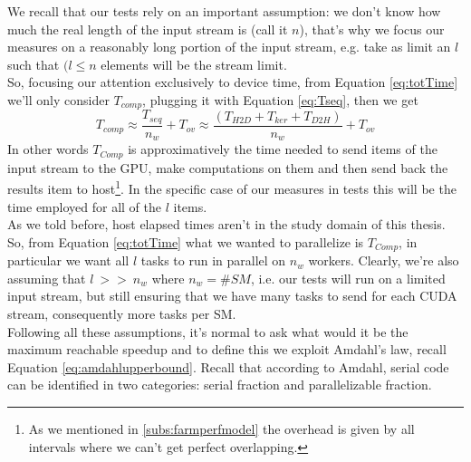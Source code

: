 We recall that our tests rely on an important assumption: we don't know how much the real length of the input stream is (call it \(n\)), that's why we focus our measures on a reasonably long portion of the input stream, e.g. take as limit an \(l\) such that \((l \leq n\) elements will be the stream limit.\\
So, focusing our attention exclusively to device time, from Equation \ref{eq:totTime} we'll only consider \(T_{comp}\), plugging it with Equation \ref{eq:Tseq}, then we get
\begin{equation}
	T_{comp} \approx  \frac{T_{seq}}{n_w} + T_{ov} \approx \frac{(T_{H2D} + T_{ker} + T_{D2H})}{n_w} + T_{ov}
\end{equation}
In other words \(T_{Comp}\) is approximatively the time needed to send items of the input stream to the GPU, make computations on them and then send back the results item to host\footnote{As we mentioned in \ref{subs:farmperfmodel} the overhead is given by all intervals where we can't get perfect overlapping.}.
In the specific case of our measures in tests this will be the time employed for all of the \(l\) items.\\
As we told before, host elapsed times aren't in the study domain of this thesis. So, from Equation \ref{eq:totTime} what we wanted to parallelize is \(T_{Comp}\), in particular we want all \(l\) tasks to run in parallel on \(n_w\) workers. Clearly, we're also assuming that \(l \ >> \ n_w \) where \(n_w= \#SM\), i.e. our tests will run on a limited input stream, but still ensuring that we have many tasks to send for each CUDA stream, consequently more tasks per SM.\\
Following all these assumptions, it's normal to ask what would it be the maximum reachable speedup and to define this we exploit Amdahl's law, recall Equation \ref{eq:amdahlupperbound}. Recall that according to Amdahl, serial code can be identified in two categories: serial fraction and parallelizable fraction.\\
